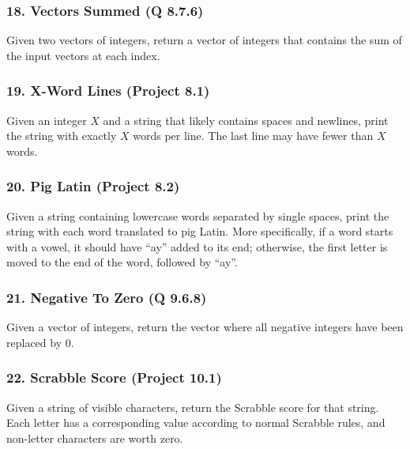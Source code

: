 \documentclass{sig-alternate}
\begin{document}
\subsubsection*{18. Vectors Summed (Q 8.7.6)}
Given two vectors of integers, return a vector of integers that contains the sum of the input vectors at each index.

\subsubsection*{19. X-Word Lines (Project 8.1)}
Given an integer $X$  and a string that likely contains spaces and newlines, print the string with exactly $X$ words per line. The last line may have fewer than $X$ words.

\subsubsection*{20. Pig Latin (Project 8.2)}
Given a string containing lowercase words separated by single spaces, print the string with each word translated to pig Latin. More specifically, if a word starts with a vowel, it should have ``ay'' added to its end; otherwise, the first letter is moved to the end of the word, followed by ``ay''.

\subsubsection*{21. Negative To Zero (Q 9.6.8)}
Given a vector of integers, return the vector where all negative integers have been replaced by 0.

\subsubsection*{22. Scrabble Score (Project 10.1)}
Given a string of visible characters, return the Scrabble score for that string. Each letter has a corresponding value according to normal Scrabble rules, and non-letter characters are worth zero.
\end{document}
